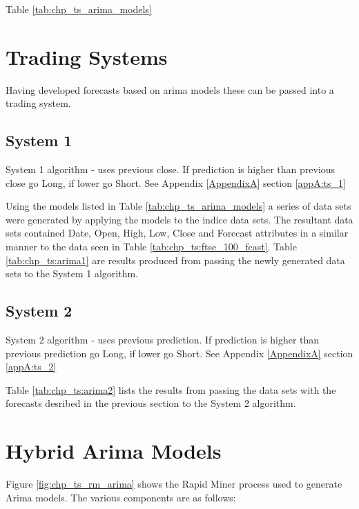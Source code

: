 Table \ref{tab:chp_ts_arima_models} 


\section{Trading Systems}
Having developed forecasts based on arima models these can be passed into a trading system.

\subsection{System 1}
System 1 algorithm - uses previous close. If prediction is higher than previous close go Long, if lower go Short. See Appendix \ref{AppendixA} section \ref{appA:ts_1}

Using the models listed in Table \ref{tab:chp_ts_arima_models} a series of data sets were generated by applying the models to the indice data sets. The resultant data sets contained Date, Open, High, Low, Close and Forecast attributes in a similar manner to the data seen in Table  \ref{tab:chp_ts:ftse_100_fcast}. Table \ref{tab:chp_ts:arima1} are results produced from passing the newly generated data sets to the System 1 algorithm.



\subsection{System 2}
System 2 algorithm - uses previous prediction. If prediction is higher than previous prediction go Long, if lower go Short. See Appendix \ref{AppendixA} section \ref{appA:ts_2}

Table \ref{tab:chp_ts:arima2} lists the results from passing the data sets with the forecasts desribed in the previous section to the System 2 algorithm.


\section{Hybrid Arima Models}
Figure \ref{fig:chp_ts_rm_arima} shows the Rapid Miner process used to generate Arima models. The various components are as follows:

